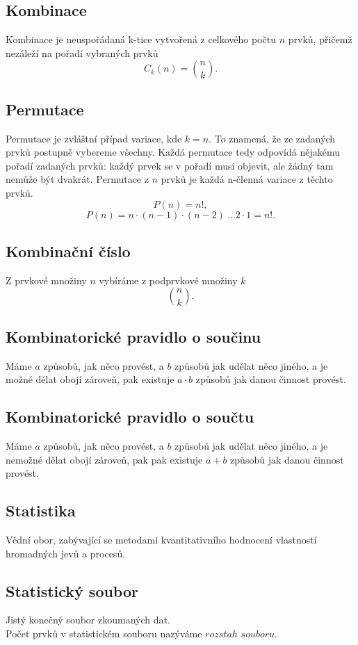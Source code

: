     \subsection{Kombinace}
    Kombinace je neuspořádaná k-tice vytvořená z celkového počtu $n$ prvků, přičemž nezáleží na pořadí vybraných prvků
    $$
    C_k (n)= {n \choose k}.
    $$
    \subsection{Permutace}
    Permutace je zvláštní případ variace, kde $k=n$. To znamená, že ze zadaných prvků postupně vybereme všechny. Každá permutace tedy odpovídá nějakému pořadí zadaných prvků: každý prvek se v pořadí musí objevit, ale žádný tam nemůže být dvakrát. Permutace z $n$ prvků je každá n-členná variace z těchto prvků.
    $$
    P(n)=n!,
    $$
    $$
    P(n)=n \cdot(n-1)\cdot(n-2) \ ...2\cdot1=n!.
    $$
    \subsection{Kombinační číslo}
    Z prvkové množiny $n$ vybíráme z podprvkové množiny $k$\\
    $$
    {n \choose k}.
    $$
    \subsection{Kombinatorické pravidlo o součinu}
    Máme $a$ způsobů, jak něco provést, a $b$ způsobů jak udělat něco jiného, a je možné dělat obojí zároveň, pak existuje $a\cdot b$ způsobů jak danou činnost provést.
    \subsection{Kombinatorické pravidlo o součtu}
    Máme $a$ způsobů, jak něco provést, a $b$ způsobů jak udělat něco jiného, a je nemožné dělat obojí zároveň, pak pak existuje $a+b$ způsobů jak danou činnost provést.
    \subsection{Statistika}
    Vědní obor, zabývající se metodami kvantitativního hodnocení vlastností hromadných jevů a procesů.
    \subsection{Statistický soubor}
    Jistý konečný soubor zkoumaných dat.\\
    Počet prvků v statistickém souboru nazýváme $rozstah$ $souboru$.
